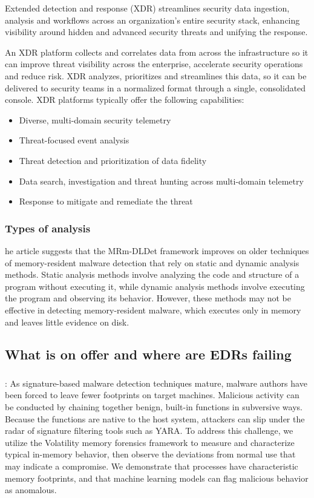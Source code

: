 \documentclass{article}
\begin{document}
Extended detection and response (XDR) streamlines security data ingestion, analysis and workflows across an organization’s entire security stack, enhancing visibility around hidden and advanced security threats and unifying the response.

An XDR platform collects and correlates data from across the infrastructure so it can improve threat visibility across the enterprise, accelerate security operations and reduce risk. XDR analyzes, prioritizes and streamlines this data, so it can be delivered to security teams in a normalized format through a single, consolidated console.
XDR platforms typically offer the following capabilities:

\begin{itemize}
\item	Diverse, multi-domain security telemetry
\item	Threat-focused event analysis
\item	Threat detection and prioritization of data fidelity
\item	Data search, investigation and threat hunting across multi-domain telemetry
\item	Response to mitigate and remediate the threat
\end{itemize}


\subsubsection{Types of analysis}
he article suggests that the MRm-DLDet framework improves on older techniques of memory-resident malware detection that rely on static and dynamic analysis methods. Static analysis methods involve analyzing the code and structure of a program without executing it, while dynamic analysis methods involve executing the program and observing its behavior. However, these methods may not be effective in detecting memory-resident malware, which executes only in memory and leaves little evidence on disk. 

\subsection{What is on offer and where are EDRs failing}

\subsubsection{\textcite{Lyles:2022}}
\textbf{}: As signature-based malware detection techniques mature, malware authors have been forced to leave fewer footprints on target machines. Malicious activity can be conducted by chaining together benign, built-in functions in subversive ways. Because the functions are native to the host system, attackers can slip under the radar of signature filtering tools such as YARA. To address this challenge, we utilize the Volatility memory forensics framework to measure and characterize typical in-memory behavior, then observe the deviations from normal use that may indicate a compromise. We demonstrate that processes have characteristic memory footprints, and that machine learning models can flag malicious behavior as anomalous.
\end{document}
